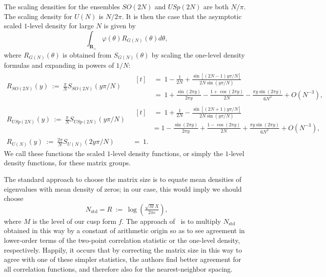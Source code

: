 \documentclass[11pt,reqno]{amsart} \usepackage{fullpage}
\newcommand{\R}{\ensuremath{\mathbf{R}}}
\newcommand\be{\begin{equation}}
\newcommand\ee{\end{equation}}
\newcommand{\nstd}{N_{\text{std}}}
\numberwithin{equation}{section}
\begin{document}
The scaling densities for the ensembles $SO(2N)$ and $USp(2N)$ are both $N/\pi$.
The scaling density for $U(N)$ is $N/2\pi$.
It is then the case that the asymptotic scaled $1$-level density for large $N$ is given
by
\be\int_{\R_+}\varphi(\theta)R_{G(N)}(\theta)d\theta,\ee
where $R_{G(N)}(\theta)$ is obtained from $S_{G(N)}(\theta)$ by scaling the one-level
density formulas and expanding in powers of $1/N$:
\begin{align}
  R_{SO(2N)}(y)\ :=\ \frac \pi N S_{SO(2N)}(y\pi/N)&\
  \begin{aligned}[t]&\ =\ 1-\frac1{2N}
    +\frac{\sin\left[(2N-1)y\pi/N\right]}{2N\sin(y\pi/N)} \\
    &\ =\ 1+\frac{\sin(2\pi y)}{2\pi y}-\frac{1+\cos(2\pi y)}{2N}-\frac{\pi y\sin(2\pi y)}{6N^2}
    +O\left(N^{-3}\right),\end{aligned} \\
  R_{USp(2N)}(y)\ :=\ \frac\pi N S_{USp(2N)}(y\pi/N)&\
  \begin{aligned}[t]&\ =\ 1+\frac1{2N}-\frac{\sin[(2N+1)y\pi/N]}{2N\sin(y\pi/N)} \\
    &=1-\frac{\sin(2\pi y)}{2\pi y}+\frac{1-\cos(2\pi y)}{2N}
    +\frac{\pi y\sin(2\pi y)}{6N^2}+O\left(N^{-3}\right),
  \end{aligned} \\
  R_{U(N)}(y)\ :=\ \frac {2\pi}N S_{U(N)}(2 y\pi/N)&\ =\ 1.
\end{align}
We call these functions the scaled $1$-level density functions, or simply the $1$-level
density functions, for these matrix groups.

The standard approach to choose the matrix size is to equate mean densities of
eigenvalues with mean density of zeros; in our case, this would imply we should choose
\be \nstd = R \ :=\  \log \left(\tfrac{\sqrt M X}{2\pi e}\right),\ee
where $M$ is the level of our cusp form $f$.
The approach of~\cite{bblm,DHKMS} is to multiply $\nstd$ obtained in this way by a
constant of arithmetic origin so as to see agreement in lower-order terms of the
two-point correlation statistic or the one-level density, respectively.
Happily, it occurs that by correcting the matrix size in this way to agree with one of
these simpler statistics, the authors find better agreement for all correlation
functions, and therefore also for the nearest-neighbor spacing.
\end{document}
